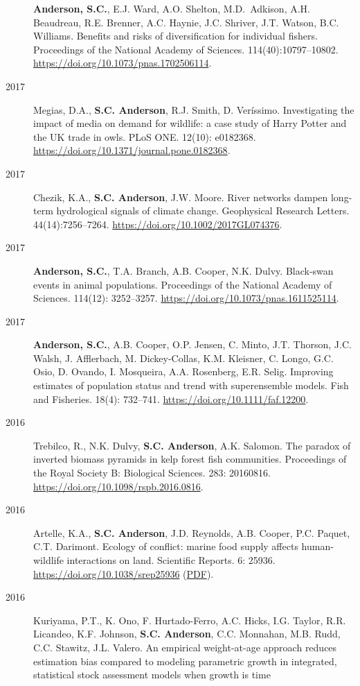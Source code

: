 \begin{description}
\textbf{Anderson, S.C.}, E.J. Ward, A.O. Shelton, M.D.\ Adkison, A.H.
Beaudreau, R.E. Brenner, A.C. Haynie, J.C. Shriver, J.T. Watson, B.C.
Williams. Benefits and risks of diversification for individual fishers.
Proceedings of the National Academy of Sciences. 114(40):10797--10802.
\url{https://doi.org/10.1073/pnas.1702506114}.
\item[2017]
Megias, D.A., \textbf{S.C. Anderson}, R.J. Smith, D. Veríssimo.
Investigating the impact of media on demand for wildlife: a case study
of Harry Potter and the UK trade in owls. PLoS ONE. 12(10): e0182368.
\url{https://doi.org/10.1371/journal.pone.0182368}.
\item[2017]
Chezik, K.A., \textbf{S.C. Anderson}, J.W. Moore. River networks dampen
long-term hydrological signals of climate change. Geophysical Research
Letters. 44(14):7256--7264. \url{https://doi.org/10.1002/2017GL074376}.
\item[2017]
\textbf{Anderson, S.C.}, T.A. Branch, A.B. Cooper, N.K. Dulvy.
Black-swan events in animal populations. Proceedings of the National
Academy of Sciences. 114(12): 3252--3257.
\url{https://doi.org/10.1073/pnas.1611525114}.
\item[2017]
\textbf{Anderson, S.C.}, A.B. Cooper, O.P. Jensen, C. Minto, J.T.
Thorson, J.C. Walsh, J. Afflerbach, M. Dickey-Collas, K.M. Kleisner, C.
Longo, G.C. Osio, D. Ovando, I. Mosqueira, A.A. Rosenberg, E.R. Selig.
Improving estimates of population status and trend with superensemble
models. Fish and Fisheries. 18(4): 732--741.
\url{https://doi.org/10.1111/faf.12200}.
\item[2016]
Trebilco, R., N.K. Dulvy, \textbf{S.C. Anderson}, A.K. Salomon. The
paradox of inverted biomass pyramids in kelp forest fish communities.
Proceedings of the Royal Society B: Biological Sciences. 283: 20160816.
\url{https://doi.org/10.1098/rspb.2016.0816}.
\item[2016]
Artelle, K.A., \textbf{S.C. Anderson}, J.D. Reynolds, A.B. Cooper, P.C.
Paquet, C.T. Darimont. Ecology of conflict: marine food supply affects
human-wildlife interactions on land. Scientific Reports. 6: 25936.
\url{https://doi.org/10.1038/srep25936}
(\href{http://www.nature.com/articles/srep25936.pdf}{PDF}).
\item[2016]
Kuriyama, P.T., K. Ono, F. Hurtado-Ferro, A.C. Hicks, I.G. Taylor, R.R.
Licandeo, K.F. Johnson, \textbf{S.C. Anderson}, C.C. Monnahan, M.B.
Rudd, C.C. Stawitz, J.L. Valero. An empirical weight-at-age approach
reduces estimation bias compared to modeling parametric growth in
integrated, statistical stock assessment models when growth is time

\end{description}
